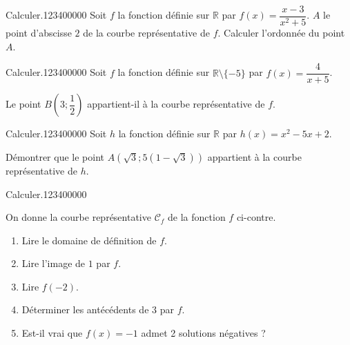 \begin{pageAD}  %
\restoregeometry %


\begin{ExoCad}{Calculer.}{1234}{0}{0}{0}{0}{0}
Soit $f$ la fonction définie sur $\mathbb R$ par $f(x)=\dfrac{x-3}{x^2+5}$. $A$ le point d'abscisse $2$ de la courbe représentative de $f$. Calculer l'ordonnée du point $A$. 

\end{ExoCad}


\begin{ExoCad}{Calculer.}{1234}{0}{0}{0}{0}{0}
Soit $f$ la fonction définie sur $\mathbb R \setminus \lbrace -5\rbrace$ par $f(x)=\dfrac{4}{x+5}$. 

Le point $B\left(3; \dfrac{1}{2}\right)$ appartient-il à la courbe représentative de $f$.

\end{ExoCad}



\begin{ExoCad}{Calculer.}{1234}{0}{0}{0}{0}{0}
Soit $h$ la fonction définie sur $\mathbb R$ par $h(x)=x^2-5x+2$. 

Démontrer que le point $A\left( \sqrt 3 ;  5\left(1-\sqrt 3\right) \right)$ appartient à la courbe représentative de $h$.

\end{ExoCad}



\begin{ExoCad}{Calculer.}{1234}{0}{0}{0}{0}{0}


\begin{minipage}{0.5\linewidth}
\vspace{0.4cm}
On donne la courbe représentative $\mathcal C_f$ de la fonction $f$ ci-contre.  

\begin{enumerate}
\item Lire le domaine de définition de $f$. 
\item Lire l'image de $1$ par $f$.  
\item Lire $f(-2)$. 
\item Déterminer les antécédents de $3$ par $f$. 
\item Est-il vrai que $f(x)=-1$ admet 2 solutions négatives ? 
\end{enumerate}
\end{minipage}
\begin{minipage}{0.5\linewidth}


\end{minipage}
\end{ExoCad}
\end{pageAD}
